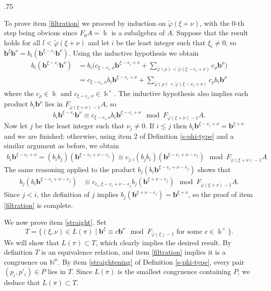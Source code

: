 \documentclass[11pt,fleqn]{article}
\makeatletter
\renewenvironment{proof}[1][\textit{Proof}]{\par
  \pushQED{\qed}%
  \normalfont \topsep.75\paraskip\relax
  \trivlist
  \item[\hskip\labelsep
        \itshape
    #1\@addpunct{.}]\ignorespaces
}{%
  \popQED\endtrivlist\@endpefalse
}
\newcommand\NN{\mathbb N}
\renewcommand\phi{\varphi}
\newcommand\tphi{\tilde \phi}
\renewcommand\b{\mathbf b}
\renewcommand\k{\Bbbk}
\makeatother
\begin{document}
\begin{proof}
To prove item \ref{filtration} we proceed by induction on $\tphi(\xi + \nu)$, with the
$0$-th step being obvious since $F_0A = \k$ is a subalgebra of $A$. Suppose that the
result holds for all $l < \tphi(\xi + \nu)$ and let $i$ be the least integer such that
$\xi_i \neq 0$, so $\b^\xi \b^\nu = b_i (\b^{\xi - e_i} \b ^\nu)$. Using the inductive
hypothesis we obtain
\begin{align*}
b_i (\b^{\xi - e_i} \b^\nu) 
&= b_i \bigg( c_{\xi- e_i, \nu} \b^{\xi - e_i + \nu} 
  + \sum_{\tphi(\rho) < \tphi(\xi - e_i + \nu)} c_\rho \b^\rho \bigg)\\
&= c_{\xi- e_i, \nu} b_i \b^{\xi - e_i + \nu} 
  + \sum_{\tphi(\rho) < \tphi(\xi - e_i + \nu)} c_\rho b_i \b^\rho
\end{align*}
where the $c_\rho \in \k$ and $c_{\xi - e_i,\nu} \in \k^\times$. The inductive  
hypothesis also implies each product $b_i \b^\rho$ lies in $F_{\tphi(\xi + \nu) -1} A$,
so
\[
  b_i \b^{\xi - e_i} \b^\nu \equiv c_{\xi- e_i, \nu}b_i \b^{\xi - e_i + \nu} \mod
  F_{\tphi(\xi + \nu)-1}A.
\]
Now let $j$ be the least integer such that $\nu_j \neq 0$. If $i \leq j$ then $b_i 
\b^{\xi - e_i + \nu} = \b^{\xi + \nu}$ and we are finished; otherwise, using item 2 of 
Definition \ref{s-phi-type} and a similar argument as before, we obtain
\begin{align*}
  b_i \b^{\xi - e_i + \nu} = (b_i b_j)(\b^{\xi - e_i + \nu - e_j}) \equiv c_{j,i} (b_j
  b_i)(\b^{\xi - e_i + \nu - e_j}) \mod F_{\tphi(\xi + \nu) - 1}A
\end{align*}
The same reasoning applied to the product $b_j(b_i\b^{\xi - e_i + \nu - e_j})$ shows that
\begin{align*}
  b_j (b_i \b^{\xi - e_i + \nu - e_j}) 
    &\equiv c_{e_i, \xi - e_i + \nu - e_j} b_j(\b^{\xi  + \nu - e_j}) \mod
  F_{\tphi(\xi + \nu) - 1}A.
\end{align*}
Since $j < i$, the definition of $j$ implies $b_j(\b^{\xi  + \nu - e_j}) = \b^{\xi + 
\nu}$, so the proof of item \ref{filtration} is complete.

We now prove item \ref{straight}. Set
\[
  T = \{(\xi, \nu) \in L(\pi) \mid \b^\xi \equiv c \b^{\nu} \mod
    F_{\tphi(\xi) -1}
    \mbox{ for some } c \in \k^\times\}.
\]
We will show that $L(\pi) \subset T$, which clearly implies the desired result.
By definition $T$ is an equivalence relation, and item \ref{filtration} implies it is a
congruence on $\NN^n$. By item \ref{straightening} of Definition \ref{s-phi-type}, 
every pair $(p_i, p'_i) \in P$ lies in $T$. Since $L(\pi)$ is the smallest congruence 
containing $P$, we deduce that $L(\pi) \subset T$.
\end{proof}
\end{document}
